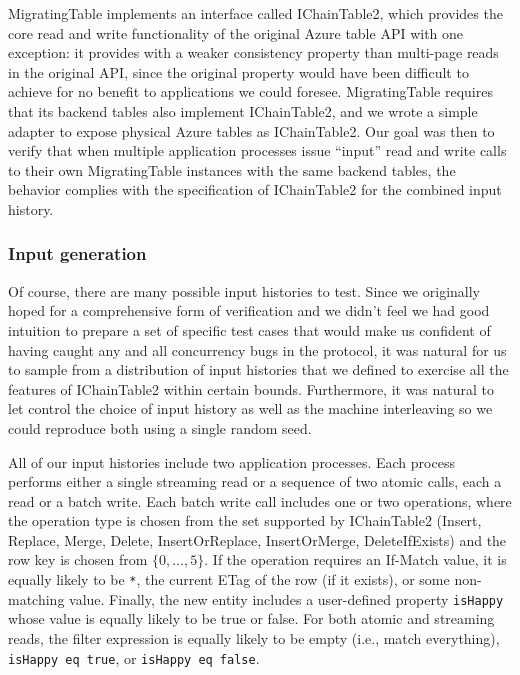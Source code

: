 MigratingTable implements an interface called IChainTable2, which provides the core read and write functionality of the original Azure table API with one exception: it provides  with a weaker consistency property than multi-page reads in the original API, since the original property would have been difficult to achieve for no benefit to applications we could foresee.  MigratingTable requires that its backend tables also implement IChainTable2, and we wrote a simple adapter to expose physical Azure tables as IChainTable2.  Our goal was then to verify that when multiple application processes issue ``input'' read and write calls to their own MigratingTable instances with the same backend tables, the behavior complies with the specification of IChainTable2 for the combined input history.

\subsubsection{Input generation}

Of course, there are many possible input histories to test.  Since we originally hoped for a comprehensive form of verification and we didn't feel we had good intuition to prepare a set of specific test cases that would make us confident of having caught any and all concurrency bugs in the protocol, it was natural for us to sample from a distribution of input histories that we defined to exercise all the features of IChainTable2 within certain bounds.  Furthermore, it was natural to let \psharp control the choice of input history as well as the machine interleaving so we could reproduce both using a single random seed.

All of our input histories include two application processes.  Each process performs either a single streaming read or a sequence of two atomic calls, each a read or a batch write.  Each batch write call includes one or two operations, where the operation type is chosen from the set supported by IChainTable2 (Insert, Replace, Merge, Delete, InsertOrReplace, InsertOrMerge, DeleteIfExists) and the row key is chosen from $\{0, \ldots, 5\}$.  If the operation requires an If-Match value, it is equally likely to be \texttt{*}, the current ETag of the row (if it exists), or some non-matching value.  Finally, the new entity includes a user-defined property \texttt{isHappy} whose value is equally likely to be true or false.  For both atomic and streaming reads, the filter expression is equally likely to be empty (i.e., match everything), \texttt{isHappy eq true}, or \texttt{isHappy eq false}.


